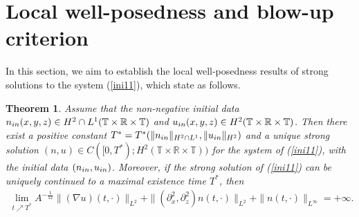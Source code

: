 \documentclass[12pt, reqno]{amsart}
\newtheorem{theorem}{Theorem}[section]
\newcommand{\ben}{\begin{eqnarray}}
\newcommand{\een}{\end{eqnarray}}
\numberwithin{equation}{section}
\begin{document}
	\section{Local well-posedness and blow-up criterion}
	 In this section, we aim to establish the local well-posedness results of strong solutions to the system (\ref{ini11}), which state as follows.
	 \begin{theorem}\label{thm:local existence}
	Assume that the non-negative initial data $ n_{\rm in}(x,y,z)\in H^2\cap L^1(\mathbb{T}\times\mathbb{R}\times\mathbb{T})$
	and $ u_{\rm in}(x,y,z)\in H^2
	(\mathbb{T}\times\mathbb{R}\times\mathbb{T})$.
	Then there exist a positive constant $T^{*}=T^{*}(\|n_{\rm in}\|_{H^2\cap L^1}, \|u_{\rm in}\|_{H^2} )$  and a unique strong solution $(n,u)\in C([0,T^*); H^2(\mathbb{T}\times\mathbb{R}\times\mathbb{T}) )$  for the system of {\rm (\ref{ini11})}, with the initial data $(n_{\rm in},u_{\rm in})$. Moreover, if the strong solution of {\rm (\ref{ini11})} can be uniquely continued to a maximal existence
time $T^*$, then 
\ben\label{eq:blow-up condi}
\lim_{t\nearrow T^*}A^{-\frac{1}{12}}\|(\nabla u)(t,\cdot)\|_{L^{2}}+
	\|(\partial_{x}^{2},\partial_{z}^{2})n(t,\cdot)\|_{L^{2}}+\|n(t,\cdot)\|_{L^{\infty}}=+\infty.
\een
\end{theorem}
\end{document}
